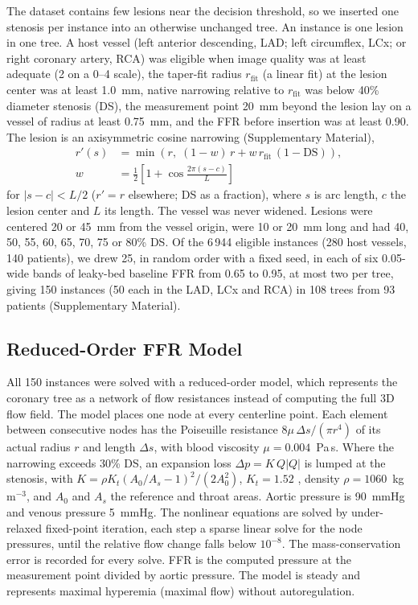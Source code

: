 \documentclass[journal,twoside,web]{ieeecolor}
\begin{document}
The dataset contains few lesions near the decision threshold, so we inserted one stenosis per instance into an
otherwise unchanged tree. An instance is one lesion in one tree. A host vessel (left anterior descending, LAD; left circumflex, LCx; or right coronary artery, RCA) was eligible
when image quality was at least adequate (2 on a 0--4 scale), the taper-fit radius $r_\mathrm{fit}$ (a linear fit) at the
lesion center was at least 1.0~mm, native narrowing relative to $r_\mathrm{fit}$ was below 40\% diameter stenosis (DS),
the measurement point 20~mm beyond the lesion lay on a vessel of radius at least 0.75~mm, and the FFR before
insertion was at least 0.90. The lesion is an axisymmetric cosine narrowing (Supplementary Material),
\begin{equation}
\begin{aligned}
r'(s) &= \min\!\left(r,\; (1-w)\,r + w\,r_\mathrm{fit}\,(1-\mathrm{DS})\right),\\
w &= \tfrac{1}{2}\left[1+\cos\tfrac{2\pi (s-c)}{L}\right]
\end{aligned}
\end{equation}
for $|s-c|<L/2$ ($r'=r$ elsewhere; DS as a fraction), where $s$ is arc length, $c$ the lesion center and $L$ its length. The vessel was never widened.
Lesions were centered 20 or 45~mm from the vessel origin, were 10 or 20~mm long and had 40, 50, 55, 60, 65, 70, 75
or 80\% DS. Of the 6\,944 eligible instances (280 host vessels, 140 patients), we drew 25, in random order with a fixed seed, in each of six 0.05-wide bands of
leaky-bed baseline FFR from 0.65 to 0.95, at most two per tree, giving 150 instances (50 each in the LAD, LCx and RCA) in 108 trees from 93
patients (Supplementary Material).

\subsection{Reduced-Order FFR Model}
All 150 instances were solved with a reduced-order model, which represents the coronary tree as a network of flow
resistances instead of computing the full 3D flow field. The model places one node at every centerline point. Each element between consecutive nodes has the Poiseuille
resistance $8\mu\,\Delta s/(\pi r^4)$ of its actual radius $r$ and length $\Delta s$, with blood viscosity
$\mu = 0.004$~Pa\,s. Where the narrowing exceeds 30\% DS, an expansion loss $\Delta p = K\,Q|Q|$ is lumped at the
stenosis, with $K = \rho K_t (A_0/A_s - 1)^2 / (2A_0^2)$, $K_t = 1.52$ \cite{young1973}, density
$\rho = 1060$~kg\,m$^{-3}$, and $A_0$ and $A_s$ the reference and throat areas. Aortic pressure is 90~mmHg and
venous pressure 5~mmHg. The nonlinear equations are solved by under-relaxed fixed-point iteration, each step a sparse linear
solve for the node pressures, until the relative flow change falls below $10^{-8}$. The mass-conservation error is recorded for every solve. FFR is the computed
pressure at the measurement point divided by aortic pressure. The model is steady and represents maximal hyperemia
(maximal flow) without autoregulation.
\end{document}
